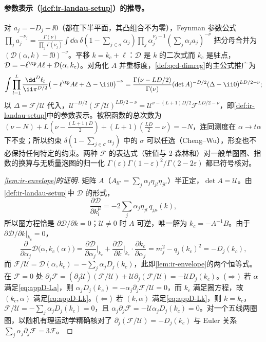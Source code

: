 \paragraph{参数表示（\cref{def:ir-landau-setup}）的推导。}对 $a_j=-D_j-\ii0$（都在下半平面，其凸组合不为零），Feynman 参数公式 $\prod_ja_j^{-\nu_j}=\frac{\Gamma(\nu)}{\prod_j\Gamma(\nu_j)}\int\dd\alpha\,\delta(1-\sum_{j\in\sigma}\alpha_j)\prod_j\alpha_j^{\nu_j-1}(\sum_j\alpha_ja_j)^{-\nu}$ 把分母合并为 $(\mathcal D(\alpha,k)-\ii0)^{-\nu}$。平移 $k=k_c+\ell$：$\mathcal D$ 是 $k$ 的二次式而 $k_c$ 是驻点，$\mathcal D=-\ell^{\tp}A\ell+\mathcal D(\alpha,k_c)$。对角化 $A$ 并重标度，\cref{def:qcd-dimreg}的主公式推广为
\[
\int\prod_{l=1}^L\frac{\dd^D\ell_l}{\ii\pi^{D/2}}\big(-\ell^{\tp}A\ell+\Delta-\ii0\big)^{-\nu}=\frac{\Gamma(\nu-LD/2)}{\Gamma(\nu)}(\det A)^{-D/2}(\Delta-\ii0)^{LD/2-\nu};
\]
以 $\Delta=\mathcal F/\mathcal U$ 代入，$\mathcal U^{-D/2}(\mathcal F/\mathcal U)^{LD/2-\nu}=\mathcal U^{\nu-(L+1)D/2}\mathcal F^{LD/2-\nu}$，即\cref{def:ir-landau-setup}中的参数表示。被积函数的总次数为 $(\nu-N)+L(\nu-\frac{(L+1)D}2)+(L+1)(\frac{LD}2-\nu)=-N$，连同测度在 $\alpha\to t\alpha$ 下不变；所以约束 $\delta(1-\sum_{j\in\sigma}\alpha_j)$ 中的 $\sigma$ 可以任选（Cheng--Wu），形变也不必保持任何特定的约束。两种 $\mathcal F$ 的表达式（驻值与 2-森林和）对一般单圈图、指数的换算与无质量泡图的归一化 $\Gamma(\varepsilon)\Gamma(1-\varepsilon)^2/\Gamma(2-2\varepsilon)$ 都已符号核对。

\begin{proof}[\cref{lem:ir-envelope}的证明]
矩阵 $A$（$A_{ll'}=\sum_j\alpha_j\eta_{jl}\eta_{jl'}$）半正定，$\det A=\mathcal U$。由\cref{def:ir-landau-setup}中 $\mathcal D$ 的形式，
\[
\frac{\partial\mathcal D}{\partial k_l^\mu}=-2\sum_j\alpha_j\eta_{jl}\,q_{j\mu}(k),
\]
所以圈方程恰是 $\partial\mathcal D/\partial k=0$；$\mathcal U\ne0$ 时 $A$ 可逆，唯一解为 $k_c=-A^{-1}B$。由于 $\partial\mathcal D/\partial k|_{k_c}=0$，
\[
\frac{\partial}{\partial\alpha_j}\mathcal D\big(\alpha,k_c(\alpha)\big)=\frac{\partial\mathcal D}{\partial\alpha_j}\Big|_{k_c}+\frac{\partial\mathcal D}{\partial k}\Big|_{k_c}\cdot\frac{\partial k_c}{\partial\alpha_j}=m_j^2-q_j(k_c)^2=-D_j(k_c),
\]
而 $\mathcal F/\mathcal U=\mathcal D(\alpha,k_c)=-\sum_j\alpha_jD_j(k_c)$，此即\cref{lem:ir-envelope}的两个恒等式。在 $\mathcal F=0$ 处 $\partial_j\mathcal F=(\partial_j\mathcal U)(\mathcal F/\mathcal U)+\mathcal U\partial_j(\mathcal F/\mathcal U)=-\mathcal U D_j(k_c)$。($\Rightarrow$)~若 $\alpha$ 满足\cref{eq:appD-La}，则 $\alpha_jD_j(k_c)=-\alpha_j\partial_j\mathcal F/\mathcal U=0$，而 $k_c$ 满足圈方程，故 $(k_c,\alpha)$ 满足\cref{eq:appD-Lk}。($\Leftarrow$)~若 $(k,\alpha)$ 满足\cref{eq:appD-Lk}，则 $k=k_c$，$\mathcal F/\mathcal U=-\sum_j\alpha_jD_j(k_c)=0$，且 $\alpha_j\partial_j\mathcal F=-\mathcal U\alpha_jD_j(k_c)=0$。对一个五线两圈图，以随机有理运动学精确核对了 $\partial_j(\mathcal F/\mathcal U)=-D_j(k_c)$ 与 Euler 关系 $\sum_j\alpha_j\partial_j\mathcal F=3\mathcal F$。
\end{proof}

